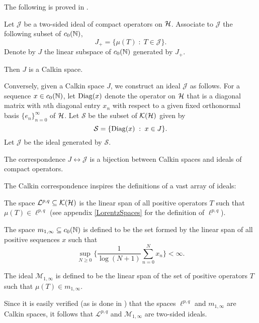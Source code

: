 The following is proved in \cite{SingularTraces}.
\begin{proposition}
    Let $\mathcal{J}$ be a two-sided ideal of compact operators on $\mathcal{H}$. Associate
    to $\mathcal{J}$ the following subset of $c_0(\mathbb{N})$,
    \begin{equation}
        J_+ = \{\mu(T)\;:\;T \in \mathcal{J}\}.
    \end{equation}
    Denote by $J$ the linear subspace of $c_0(\mathbb{N})$
    generated by $J_+$.
    
    Then $J$ is a Calkin space.
    
    
    Conversely, given a Calkin space $J$, we construct an
    ideal $\mathcal{J}$ as follows.
    For a sequence $x \in c_0(\mathbb{N})$, let $\operatorname{Diag}(x)$ denote
    the operator on $\mathcal{H}$ that is a diagonal matrix
    with $n$th diagonal entry $x_n$ with respect
    to a given fixed orthonormal basis $\{e_n\}_{n=0}^\infty$
    of $\mathcal{H}$. Let $\mathcal{S}$ be the subset of $\mathcal{K}(\mathcal{H})$
    given by
    \begin{equation}
        \mathcal{S} = \{\operatorname{Diag}(x)\;:\;x \in J\}.
    \end{equation}
    Let $\mathcal{J}$ be the ideal generated by $\mathcal{S}$.
    
    The correspondence $J \leftrightarrow \mathcal{J}$ is a bijection
    between Calkin spaces and ideals of compact operators.
\end{proposition}
    
The Calkin correspondence inspires the definitions of a vast array of ideals:
\begin{definition}
    The space $\mathcal{L}^{p,q} \subseteq \mathcal{K}(\mathcal{H})$
    is the linear span of all positive operators $T$ such that $\mu(T) \in \ell^{p,q}$ (see
    appendix \ref{LorentzSpaces} for the definition of $\ell^{p,q}$).
\end{definition}
\begin{definition}
    The space $m_{1,\infty} \subseteq c_0(\mathbb{N})$ is defined to be the set
    formed by the linear span of all positive sequences $x$ such that
    \begin{equation}
        \sup_{N \geq 0} \{\frac{1}{\log(N+1)}\sum_{n=0}^N x_n \}< \infty.
    \end{equation}
    
    The ideal $\mathcal{M}_{1,\infty}$ is defined
    to be the linear span of the set of positive operators $T$
    such that $\mu(T) \in m_{1,\infty}$.
\end{definition}
Since it is easily verified (as is done in \cite{SingularTraces})
that the spaces $\ell^{p,q}$ and $m_{1,\infty}$ are Calkin spaces, it follows
that $\mathcal{L}^{p,q}$ and $\mathcal{M}_{1,\infty}$ are two-sided ideals.

